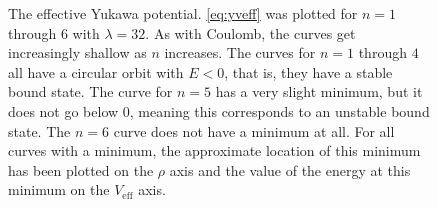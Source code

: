\documentclass[12pt,twoside]{reedthesis}
\begin{document}
\begin{figure}[h]
\caption[The effective Yukawa potential]{The effective Yukawa potential. \eqref{eq:yveff} was plotted for $n = 1$ through $6$ with $\lambda = 32$. As with Coulomb, the curves get increasingly shallow as $n$ increases. The curves for $n = 1$ through $4$ all have a circular orbit with $E < 0$, that is, they have a stable bound state. The curve for $n = 5$ has a very slight minimum, but it does not go below $0$, meaning this corresponds to an unstable bound state. The $n = 6$ curve does not have a minimum at all. For all curves with a minimum, the approximate location of this minimum has been plotted on the $\rho$ axis and the value of the energy at this minimum on the $V_{\mathrm{eff}}$ axis.}
\label{fig:yveff}
\end{figure}
\end{document}
